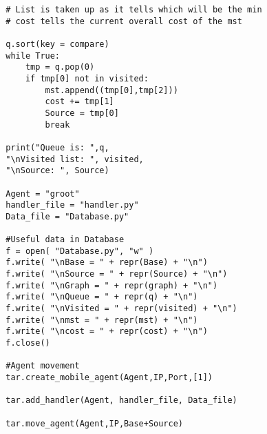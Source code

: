 \documentclass[12t]{csethesis}
\begin{document}
\begin{appendices}
\begin{lstlisting}
        # List is taken up as it tells which will be the min
        # cost tells the current overall cost of the mst
        
        q.sort(key = compare)
        while True:
            tmp = q.pop(0)
            if tmp[0] not in visited:
                mst.append((tmp[0],tmp[2]))
                cost += tmp[1]
                Source = tmp[0]
                break
        
        print("Queue is: ",q, 
        "\nVisited list: ", visited,
        "\nSource: ", Source)
        
        Agent = "groot"
        handler_file = "handler.py"
        Data_file = "Database.py"

        #Useful data in Database
        f = open( "Database.py", "w" )    
        f.write( "\nBase = " + repr(Base) + "\n")  
        f.write( "\nSource = " + repr(Source) + "\n")
        f.write( "\nGraph = " + repr(graph) + "\n")
        f.write( "\nQueue = " + repr(q) + "\n")
        f.write( "\nVisited = " + repr(visited) + "\n")
        f.write( "\nmst = " + repr(mst) + "\n")
        f.write( "\ncost = " + repr(cost) + "\n")
        f.close()

        #Agent movement
        tar.create_mobile_agent(Agent,IP,Port,[1])
        
        tar.add_handler(Agent, handler_file, Data_file)
        
        tar.move_agent(Agent,IP,Base+Source)

\end{lstlisting}
\clearpage
\end{appendices}
\end{document}
